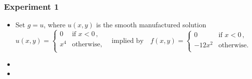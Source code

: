 \documentclass[aspectratio=169,xcolor=dvipsnames,11pt]{beamer}
\begin{document}
\begin{frame}\frametitle{Experiment 1}
\begin{itemize}
\item Set $g=u$, where $u(x,y)$ is the smooth manufactured solution
\begin{equation}
\label{eq:Biactivity_SmoothManufacturedSolution}
	u(x,y)
	=
	\begin{cases}
		0 & \text{if~} x < 0\,,\\
		x^4 & \text{otherwise,}\\
	\end{cases}
	\quad
	\text{implied by}
	\quad
	f(x,y)
	=
	\begin{cases}
		0 & \text{if~} x < 0\,,\\
		-12x^2 & \text{otherwise.}\\
	\end{cases}
\end{equation}
\item {}
\item {} 
\end{itemize}
\end{frame}
\end{document}
